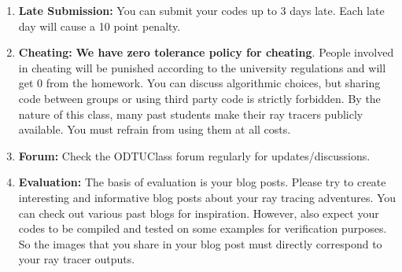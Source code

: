 \documentclass[12pt]{article}
\begin{document}
\begin{enumerate}
\item \textbf{Late Submission:} You can submit your codes up to 3 days
late. Each late day will cause a 10 point penalty.

\item \textbf{Cheating:} \textbf{We have zero tolerance policy
for cheating}.  People involved in cheating will be
punished according to the university regulations and will
get 0 from the homework. You can discuss algorithmic choices,
but sharing code between groups or using third party code
is strictly forbidden. By the nature of this class, many past students
make their ray tracers publicly available. You must refrain from using
them at all costs.

\item \textbf{Forum:} Check the ODTUClass forum regularly for
updates/discussions.

\item \textbf{Evaluation:} The basis of evaluation is your blog posts.
Please try to create interesting and informative blog posts about your
ray tracing adventures. You can check out various past blogs for
inspiration. However, also expect your codes to be compiled and tested
on some examples for verification purposes. So the images that you share
in your blog post must directly correspond to your ray tracer outputs.

\end{enumerate}
\end{document}
